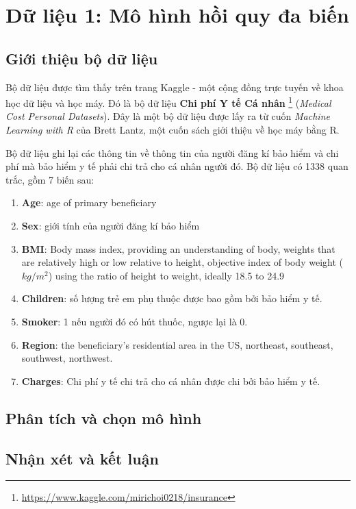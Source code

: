 \section{Dữ liệu 1: Mô hình hồi quy đa biến}

\subsection*{Giới thiệu bộ dữ liệu}
Bộ dữ liệu được tìm thấy trên trang Kaggle - một cộng đồng trực tuyến về khoa học dữ liệu và học máy. Đó là bộ dữ liệu \textbf{Chi phí Y tế Cá nhân} \footnote{\url{https://www.kaggle.com/mirichoi0218/insurance}} (\textit{Medical Cost Personal Datasets}). Đây là một bộ dữ liệu được lấy ra từ cuốn \textit{Machine Learning with R} của Brett Lantz, một cuốn sách giới thiệu về học máy bằng R.

Bộ dữ liệu ghi lại các thông tin về thông tin của người đăng kí bảo hiểm và chi phí mà bảo hiểm y tế phải chi trả cho cá nhân người đó. Bộ dữ liệu có 1338 quan trắc, gồm 7 biến sau:
\begin{enumerate}
	\item \textbf{Age}: age of primary beneficiary
	\item \textbf{Sex}: giới tính của người đăng kí bảo hiểm
	\item \textbf{BMI}: Body mass index, providing an understanding of body, weights that are relatively high or low relative to height,	objective index of body weight ($kg / m ^ 2$) using the ratio of height to weight, ideally 18.5 to 24.9
	\item \textbf{Children}: số lượng trẻ em phụ thuộc được bao gồm bởi bảo hiểm y tế.	
	\item \textbf{Smoker}: 1 nếu người đó có hút thuốc, ngược lại là 0.
	\item \textbf{Region}: the beneficiary's residential area in the US, northeast, southeast, southwest, northwest.
	\item \textbf{Charges}: Chi phí y tế chi trả cho cá nhân được chi bởi bảo hiểm y tế.
\end{enumerate}

\subsection*{Phân tích và chọn mô hình}

\subsection*{Nhận xét và kết luận}